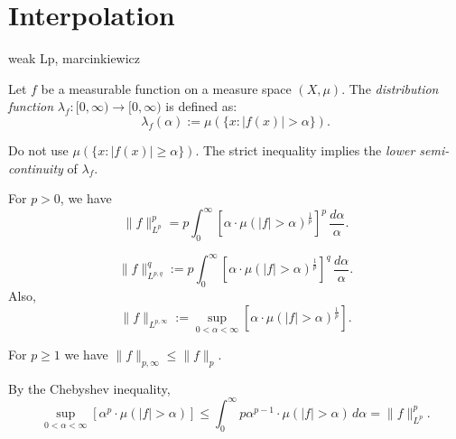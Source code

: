 \documentclass{../../large}
\begin{document}
\section{Interpolation}
weak Lp, marcinkiewicz



\begin{defn}
Let $f$ be a measurable function on a measure space $(X,\mu)$.
The \emph{distribution function} $\lambda_f:[0,\infty)\to [0,\infty)$ is defined as:
\[\lambda_f(\alpha):=\mu(\{x:|f(x)|>\alpha\}).\]
\end{defn}


Do not use $\mu(\{x:|f(x)|\ge\alpha\})$.
The strict inequality implies the \emph{lower semi-continuity} of $\lambda_f$.

\begin{parts}
\item For $p>0$, we have
\[\|f\|_{L^p}^p=p\int_0^\infty\left[\alpha\cdot\mu(|f|>\alpha)^\frac1p\right]^p\,\frac{d\alpha}\alpha.\]
\end{parts}
\begin{defn}
\[\|f\|_{L^{p,q}}^q:=p\int_0^\infty\left[\alpha\cdot\mu(|f|>\alpha)^\frac1p\right]^q\,\frac{d\alpha}\alpha.\]
Also,
\[\|f\|_{L^{p,\infty}}:=\sup_{0<\alpha<\infty}\left[\alpha\cdot\mu(|f|>\alpha)^\frac1p\right].\]
\end{defn}
\begin{thm}
For $p\ge1$ we have $\|f\|_{p,\infty}\le\|f\|_p$.
\end{thm}
\begin{pf}
By the Chebyshev inequality,
\[\sup_{0<\alpha<\infty}\left[\alpha^p\cdot\mu(|f|>\alpha)\right]\le\int_0^\infty p\alpha^{p-1}\cdot\mu(|f|>\alpha)\,d\alpha=\|f\|_{L^p}^p.\]

\end{pf}
\end{document}
